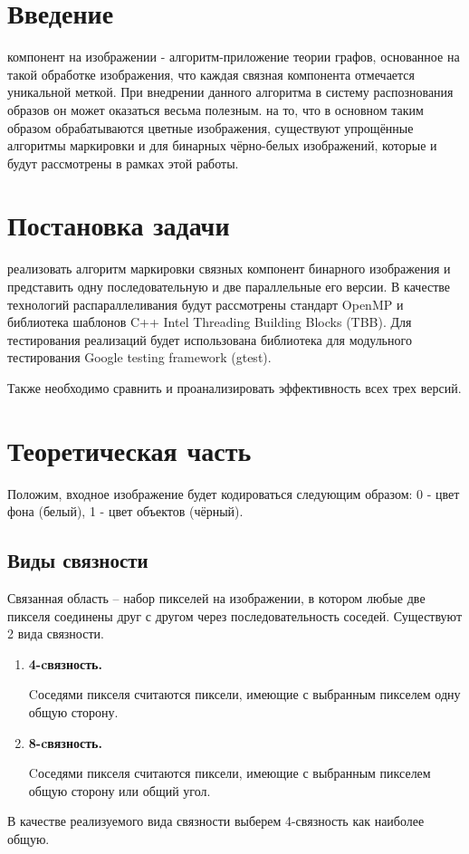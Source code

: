 \documentclass{report}
\begin{document}
\setcounter{page}{2}

\tableofcontents
\newpage

\section*{Введение}
 компонент на изображении - алгоритм-приложение теории графов, основанное на такой обработке изображения, что каждая связная компонента отмечается уникальной меткой. При внедрении данного алгоритма в систему распознования образов он может оказаться весьма полезным. 
 на то, что в основном таким образом обрабатываются цветные изображения, существуют упрощённые алгоритмы маркировки и для бинарных чёрно-белых изображений, которые и будут рассмотрены в рамках этой работы.

\newpage

\section*{Постановка задачи}
 реализовать алгоритм маркировки связных компонент бинарного изображения и представить одну последовательную и две параллельные его версии. В качестве технологий распараллеливания будут рассмотрены стандарт OpenMP и  библиотека шаблонов C++ Intel Threading Building Blocks (TBB). Для тестирования реализаций будет использована библиотека для модульного тестирования Google testing framework (gtest).
\par Также необходимо сравнить и проанализировать эффективность всех трех версий. 

\newpage

\section*{Теоретическая часть}
Положим, входное изображение будет кодироваться следующим образом: 0 - цвет фона (белый), 1 - цвет объектов (чёрный).
\subsection{Виды связности}
Связанная область – набор пикселей на изображении, в котором любые две пикселя соединены друг с другом через последовательность соседей.
Существуют 2 вида связности.
\begin{enumerate}
    \item \textbf{4-cвязность.}
    \par Cоседями пикселя считаются пиксели, имеющие с выбранным пикселем одну общую сторону.
    \item \textbf{8-cвязность.}
    \par Cоседями пикселя считаются пиксели, имеющие с выбранным пикселем общую сторону или общий угол.
\end{enumerate}
\par В качестве реализуемого вида связности выберем 4-связность как наиболее общую.
\end{document}
